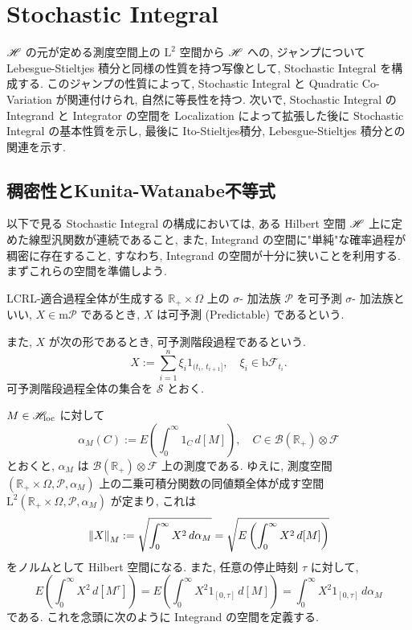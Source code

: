 \documentclass{ltjsarticle}
\begin{document}
\section{Stochastic Integral}
\( \mathscr{H} \) の元が定める測度空間上の \( \mathrm{L}^2 \) 空間から \( \mathscr{H} \) への, ジャンプについてLebesgue-Stieltjes 積分と同様の性質を持つ写像として, Stochastic Integral を構成する.
このジャンプの性質によって, Stochastic Integral と Quadratic Co-Variation が関連付けられ,
自然に等長性を持つ.
次いで, Stochastic Integral のIntegrand と Integrator の空間を Localization によって拡張した後に
Stochastic Integral の基本性質を示し,
最後に Ito-Stieltjes積分, Lebesgue-Stieltjes 積分との関連を示す.

\subsection{稠密性とKunita-Watanabe不等式}
以下で見る Stochastic Integral の構成においては, ある Hilbert 空間 \( \mathscr{H} \) 上に定めた線型汎関数が連続であること, また, Integrand の空間に"単純"な確率過程が稠密に存在すること, すなわち, 
Integrand の空間が十分に狭いことを利用する.
まずこれらの空間を準備しよう.

\begin{dfn}[可予測過程]
	LCRL-適合過程全体が生成する \( \mathbb{R}_{+} \times \Omega \) 上の
	\( \sigma \)- 加法族 \( \mathscr{P} \) を可予測 \( \sigma \)- 加法族といい,
	\( X \in \mathrm{m}\mathscr{P} \) であるとき, \( X \) は可予測 (Predictable) であるという.
	
	また, \( X \) が次の形であるとき, 可予測階段過程であるという.
	\begin{equation} \label{PredStep}
		X := \sum_{ i = 1 }^n \xi_i 1_{(t_i,\, t_{ i + 1 }]},
		\quad	\xi_i \in \mathrm{b}\mathscr{F}_{t_i}.
	\end{equation}
	可予測階段過程全体の集合を \( \mathscr{S} \) とおく.
	\fin\end{dfn}

\( M \in \mathscr{H}_{\mathrm{loc}} \) に対して
\[
	\alpha_M(C) := E \left( \int_0^{\infty} 1_C\, d[M] \right),
	\quad C \in \mathscr{B}(\mathbb{R}_{+}) \otimes \mathscr{F}
\]
とおくと, \( \alpha_M \) は \( \mathscr{B}(\mathbb{R}_{+}) \otimes \mathscr{F} \) 上の測度である.
ゆえに, 測度空間 \( ( \mathbb{R}_{+} \times \Omega, \mathscr{P}, \alpha_M) \) 上の二乗可積分関数の同値類全体が成す空間
\(
\mathrm{L}^2( \mathbb{R}_{+} \times \Omega, \mathscr{P}, \alpha_M)
\)
が定まり, これは
\[
	\left\| X \right\|_{M} := \sqrt{ \int_0^{\infty} X^2\, d\alpha_M }
	=	\sqrt{ E\left( \int_0^{\infty} X^2\, d[M] \right) }
\]
をノルムとして Hilbert 空間になる. また, 任意の停止時刻 \( \tau \) に対して,
\[
	E\left( \int_0^{\infty} X^2\, d[M^{\tau}] \right)	=
	E\left( \int_0^{\infty} X^2 1_{[0,\tau]}\, d[M] \right)	=
	\int_0^{\infty} X^2 1_{[0,\tau]} \, d\alpha_M
\]
である. これを念頭に次のように Integrand の空間を定義する.
\end{document}
